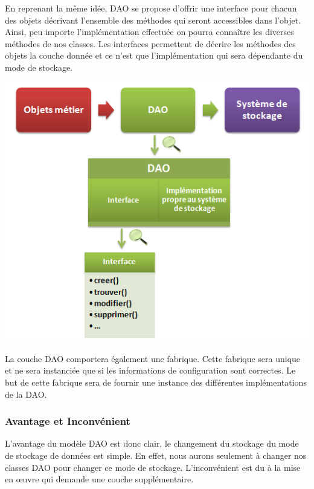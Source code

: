 En reprenant la même idée, DAO se propose d'offrir une interface pour chacun des objets décrivant l'ensemble des méthodes qui seront accessibles dans l'objet. Ainsi, peu importe l'implémentation effectuée on pourra connaître les diverses méthodes de nos classes. Les interfaces permettent de décrire les méthodes des objets la couche donnée et ce n'est que l'implémentation qui sera dépendante du mode de stockage. \\ 
\begin{center}
\includegraphics[scale=0.5]{../graph/dao2.png} \\
\end{center}

La couche DAO comportera également une fabrique. Cette fabrique sera unique et ne sera instanciée que si les informations de configuration sont correctes. Le but de cette fabrique sera de fournir une instance des différentes implémentations de la DAO.

\subsubsection{Avantage et Inconvénient}
L'avantage du modèle DAO est donc clair, le changement du stockage du mode de stockage de données est simple. En effet, nous aurons seulement à changer nos classes DAO pour changer ce mode de stockage. L'inconvénient est du à la mise en œuvre qui demande une couche supplémentaire. 




